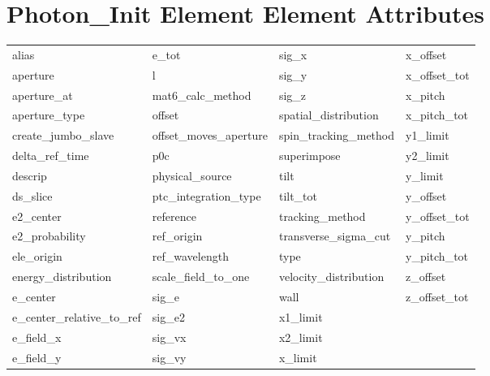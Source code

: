  \section{Photon_Init Element Element Attributes}
 \label{s:list.photon.init}
 
 \begin{tabular}{llll} \toprule
alias                       & e_tot                       & sig_x                       & x_offset                    \\
aperture                    & l                           & sig_y                       & x_offset_tot                \\
aperture_at                 & mat6_calc_method            & sig_z                       & x_pitch                     \\
aperture_type               & offset                      & spatial_distribution        & x_pitch_tot                 \\
create_jumbo_slave          & offset_moves_aperture       & spin_tracking_method        & y1_limit                    \\
delta_ref_time              & p0c                         & superimpose                 & y2_limit                    \\
descrip                     & physical_source             & tilt                        & y_limit                     \\
ds_slice                    & ptc_integration_type        & tilt_tot                    & y_offset                    \\
e2_center                   & reference                   & tracking_method             & y_offset_tot                \\
e2_probability              & ref_origin                  & transverse_sigma_cut        & y_pitch                     \\
ele_origin                  & ref_wavelength              & type                        & y_pitch_tot                 \\
energy_distribution         & scale_field_to_one          & velocity_distribution       & z_offset                    \\
e_center                    & sig_e                       & wall                        & z_offset_tot                \\
e_center_relative_to_ref    & sig_e2                      & x1_limit                    &                             \\
e_field_x                   & sig_vx                      & x2_limit                    &                             \\
e_field_y                   & sig_vy                      & x_limit                     &                             \\
 \bottomrule
 \end{tabular}
 \vfill
 
